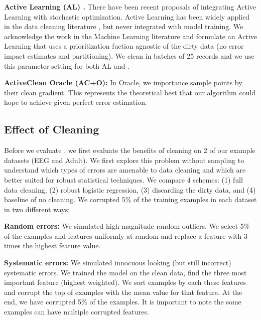 \vspace{0.5em}

\noindent\textbf{Active Learning (AL) \cite{guillory2009active}. } There have been recent proposals of integrating Active Learning with stochastic optimization. Active Learning has been widely applied in the data cleaning literature \cite{gokhale2014corleone}, but never integrated with model training. We acknowledge the work in the Machine Learning literature and formulate an Active Learning that uses a prioritization fuction agnostic of the dirty data (no error impact estimates and partitioning). We clean in batches of 25 records and we use this parameter setting for both AL and \sys.

\vspace{0.5em}

\noindent\textbf{ActiveClean Oracle (AC+O): } In \sys Oracle, we importance sample points by their clean gradient. This represents the theoretical best that our algorithm could hope to achieve given perfect error estimation.

\subsection{Effect of Cleaning}
Before we evaluate \sys, we first evaluate the benefits of cleaning on 2 of our example datasets (EEG and Adult).
We first explore this problem without sampling to understand which types of errors are amenable to data cleaning and which are better suited for robust statistical techniques.
We compare 4 schemes: (1) full data cleaning, (2) robust logistic regression, (3) discarding the dirty data, and (4) baseline of no cleaning. We corrupted 5\% of the training examples in each dataset in two different ways:

\vspace{0.5em}

\noindent\textbf{Random errors: } We simulated high-magnitude random outliers. We select 5\% of the examples and features uniformly at random and replace a feature with 3 times the highest feature value.

\vspace{0.5em}

\noindent\textbf{Systematic errors: } We simulated innocuous looking (but still incorrect) systematic errors. We trained the model on the clean data, find the three most important feature (highest weighted). We sort examples by each these features and corrupt the top of examples with the mean value for that feature. 
At the end, we have corrupted 5\% of the examples.
It is important to note the some examples can have multiple corrupted features.

